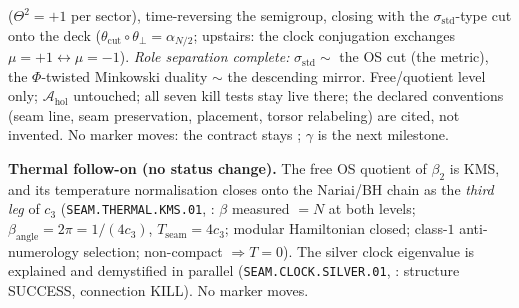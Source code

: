 \documentclass[11pt,a4paper]{article}
\begin{document}
($\Theta^2=+1$ per sector), time-reversing the semigroup, closing with the
$\sigma_{\mathrm{std}}$-type cut onto the deck ($\theta_{\mathrm{cut}}\circ\theta_\perp
=\alpha_{N/2}$; upstairs: the clock conjugation exchanges $\mu=+1\leftrightarrow\mu=-1$).
\emph{Role separation complete:} $\sigma_{\mathrm{std}}\sim$ the OS cut (the metric), the
$\Phi$-twisted Minkowski duality $\sim$ the descending mirror.  Free/quotient level only;
$\mathcal A_{\mathrm{hol}}$ untouched; all seven kill tests stay live there; the declared
conventions (seam line, seam preservation, placement, torsor relabeling) are cited, not
invented.  No marker moves: the contract stays \mO; $\gamma$ is the next milestone.

\par\smallskip\noindent\textbf{Thermal follow-on (no status change).} The free OS quotient of
$\beta_2$ is KMS, and its temperature normalisation closes onto the Nariai/BH chain as the
\emph{third leg} of $c_3$ (\texttt{SEAM.THERMAL.KMS.01},
: $\beta$ measured $=N$ at both levels;
$\beta_{\mathrm{angle}}=2\pi=1/(4c_3)$, $T_{\mathrm{seam}}=4c_3$; modular Hamiltonian closed;
class-$1$ anti-numerology selection; non-compact $\Rightarrow T=0$). The silver clock
eigenvalue is explained and demystified in parallel (\texttt{SEAM.CLOCK.SILVER.01},
: structure SUCCESS, connection KILL). No marker
moves.
\end{document}
